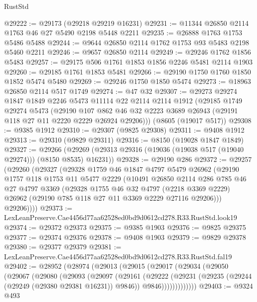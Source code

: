 \begin{lexlean}{RustStd}
\begin{coremodule}
@29222 := @29173 (@29218 @29219 @16231)
@29231 := @11344 @26850 @2114 @1763 @46 @27 @5490 @2198 @5448 @2211
@29235 := @26888 @1763 @1753 @5486 @5488
@29244 := @9644 @26850 @2114 @1762 @1753 @93 @5483 @2198 @5460 @2211
@29246 := @9657 @26850 @2114
@29249 := @29246 @1762 @1856 @5483
@29257 := @29175 @506 @1761 @1853 @1856 @2246 @5481 @2114 @1903
@29260 := @29185 @1761 @1853 @5481
@29266 := @29190 @1750 @1760 @1850 @1852 @5474 @5480
@29269 := @29246 @1750 @1850 @5474
@29273 := @18963 @26850 @2114 @517 @1749
@29274 := @47 @32
@29307 := @29273
    @29274
    @1847
    @1849
    @2246
    @5473
    @11114
    @22
    @2114
    @2114
    @1912
    (@29185
      @1749
      @29274
      @5473
      (@29190 @107 @862 @46 @32 @2223 @3689 @26943 (@29191 @118 @27 @11 @2220 @2229 @26924 @29206)))
    (@8605 (@19017 @517))
@29308 := @9385 @1912
@29310 := @29307 (@9825 @29308)
@29311 := @9408 @1912
@29313 := @29310 (@9829 @29311)
@29316 := @8150 (@19028 @1847 @1849)
@29327 := @29266
    (@29269 (@29313 @29316 (@19036 (@19038 @517 (@19040 @29274))) (@8150 @8535) @16231))
@29328 := @29190 @286
@29372 := @29257
    (@29260
      (@29327
        (@29328
          @1759
          @46
          @1847
          @4797
          @5479
          @26962
          (@29190
            @1757
            @118
            @1753
            @11
            @5477
            @2229
            (@10491
              @26850
              @2114
              @286
              @785
              @46
              @27
              @4797
              @3369
              (@29328
                @1755
                @46
                @32
                @4797
                (@2218 @3369 @2229)
                @26962
                (@29190 @785 @118 @27 @11 @3369 @2229 @27116 @29206)))
            @29206))))
@29373 := LexLeanPreserve.Cae4456d77aa62528ed0bd9d0612cd278.R33.RustStd.look19
@29374 := @29372 @29373
@29375 := @9385 @1903
@29376 := @9825 @29375
@29377 := @29374 @29376
@29378 := @9408 @1903
@29379 := @9829 @29378
@29380 := @29377 @29379
@29381 := LexLeanPreserve.Cae4456d77aa62528ed0bd9d0612cd278.R33.RustStd.fal19
@29402 := @28952
    (@28974
      (@29013
        (@29015
          (@29017
            (@29034
              (@29050
                (@29067
                  (@29080
                    (@29093
                      (@29097
                        (@29161
                          (@29222
                            (@29231
                              (@29235 (@29244 (@29249 (@29380 @29381 @16231)) @9846))
                              @9846)))))))))))))
@29403 := @9324 @493

\end{coremodule}
\end{lexlean}
